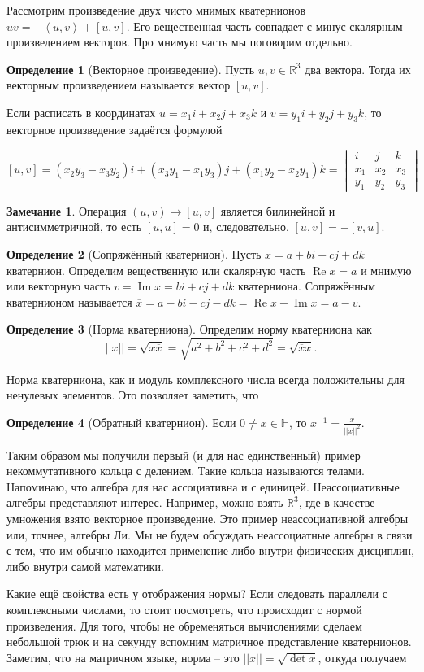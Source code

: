 \documentclass[10pt,a4paper,oneside]{book}
\theoremstyle{definition}
\newtheorem*{rem}{Замечание}
\newtheorem*{defn}{{\color{yellow!30!red} Определение}}
\renewcommand{\Re}{\operatorname{Re}}
\newcommand{\mb}[1]{\mathbb{#1}}
\newcommand{\ovl}{\overline}
\renewcommand{\Im}{\operatorname{Im}}
\def\lan{\left\langle }
\def\ran{\right\rangle}
\def\dfn{\begin{defn}}
\def\edfn{\end{defn}}
\def\rm{\begin{rem}}
\def\erm{\end{rem}}
\begin{document}
Рассмотрим произведение двух чисто мнимых кватернионов $uv=-\lan u,v\ran+[u,v]$. Его вещественная часть совпадает с минус скалярным произведением векторов. Про мнимую часть мы поговорим отдельно.

\dfn[Векторное произведение] Пусть $u,v \in \mb R^3$ два вектора. Тогда их векторным произведением называется вектор $[u,v]$.
\edfn

Если расписать в координатах $u=x_1i+x_2j+x_3k$ и  $v=y_1i+y_2j+y_3k$, то векторное произведение задаётся формулой

$$[u,v]= (x_2y_3-x_3y_2)i + (x_3y_1-x_1y_3)j + (x_1y_2- x_2y_1)k= \begin{vmatrix} i& j&k \\ x_1 & x_2 & x_3 \\ y_1 & y_2 & y_3 \end{vmatrix} $$

\rm Операция $(u,v) \to [u,v]$ является билинейной и антисимметричной, то есть $[u,u]=0$ и, следовательно, $[u,v]=-[v,u]$.
\erm


\dfn[Сопряжённый кватернион] Пусть $x= a+bi+cj+dk$ кватернион. Определим вещественную или скалярную часть $\Re x=a$ и мнимую или векторную часть $v=\Im x= bi+cj+dk$ кватерниона. Сопряжённым кватернионом называется $\ovl{x}= a-bi-cj-dk= \Re x - \Im x =a-v$. 
\edfn

\dfn[Норма кватерниона] Определим норму кватерниона как $$||x||=\sqrt{x\ovl{x}}=\sqrt{ a^2+b^2+c^2+d^2}=\sqrt{\ovl{x}x}.$$
\edfn 


Норма кватерниона, как и модуль комплексного числа всегда положительны для ненулевых элементов. Это позволяет заметить, что

\dfn[Обратный кватернион] Если $0\neq x \in \mb H$, то $x^{-1}=\frac{\ovl{x}}{||x||^2}$. 
\edfn

Таким образом мы получили первый (и для нас единственный) пример некоммутативного кольца с делением. Такие кольца называются телами. Напоминаю, что алгебра для нас ассоциативна и с единицей. Неассоциативные алгебры представляют интерес. Например, можно взять $\mb R^3$, где в качестве умножения взято векторное произведение. Это пример неассоциативной алгебры или, точнее, алгебры Ли. Мы не будем обсуждать неассоциатные алгебры в связи с тем, что им обычно находится применение либо внутри физических дисциплин, либо внутри самой математики. 

Какие ещё свойства есть у отображения нормы? Если следовать параллели с комплексными числами, то стоит посмотреть, что происходит с нормой произведения. Для того, чтобы не обременяться вычислениями сделаем небольшой трюк и на секунду вспомним матричное представление кватернионов. Заметим, что на матричном языке, норма -- это $||x||=\sqrt{\det x}$, откуда получаем
\end{document}
